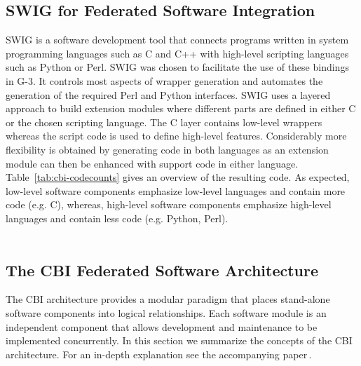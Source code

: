 \documentclass[10pt]{article}
\begin{document}
\subsection*{SWIG for Federated Software Integration}

SWIG is a software development tool that connects programs written
in system programming languages such as C and C++ with high-level scripting 
languages such as Python or Perl. SWIG was chosen to facilitate 
the use of these bindings in
G-3. It controls most aspects of wrapper
generation and automates the generation of the required Perl and
Python interfaces. SWIG uses a layered approach to build extension
modules where different parts are defined in either C or the chosen
scripting language. The C layer contains low-level wrappers whereas
the script code is used to define high-level features.  Considerably
more flexibility is obtained by generating code in both languages as
an extension module can then be enhanced with support code in either
language.  Table~\ref{tab:cbi-codecounts} gives an overview of the
resulting code.  As expected, low-level software components emphasize
low-level languages and contain more code (e.g. C), whereas, high-level
software components emphasize high-level languages and contain less
code (e.g. Python, Perl).\\

\\

\subsection*{The CBI Federated Software Architecture}
\label{subsec:cbi}

The CBI architecture provides a modular paradigm that places stand-alone
software components into logical relationships.  Each software module
is an independent component that allows development and
maintenance to be implemented concurrently.
In this section we summarize the concepts of the CBI architecture.
For an in-depth explanation see the accompanying paper\,\cite{cornelis11b}.
\end{document}
